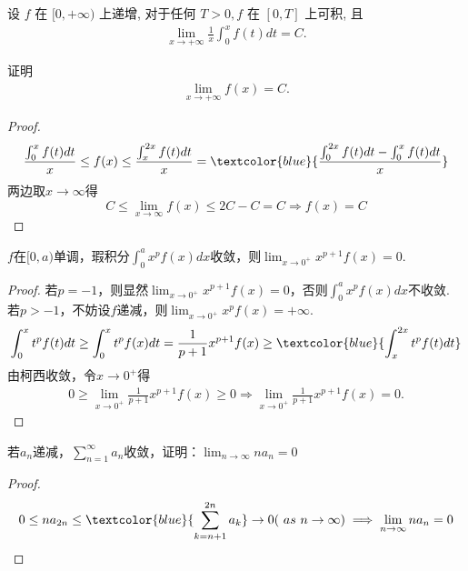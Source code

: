 \begin{exercise}
设 $f$ 在 $[0,+\infty)$ 上递增, 对于任何 $T>0, f$ 在 $[0, T]$ 上可积, 且
\begin{align*}
    \lim _{x \rightarrow+\infty} \frac{1}{x} \int_0^x f(t) d t=C .
\end{align*}

证明
\begin{align*}
    \lim _{x \rightarrow+\infty} f(x)=C .
\end{align*}
\end{exercise}

\begin{proof}
    $$\frac{\int_{0}^{x}f(t)dt}{x}\le f(x)\le \frac{\int_{x}^{2x}f(t)dt}{x}=\textcolor{blue}{\frac{\int_{0}^{2x}f(t)dt-\int_{0}^{x}f(t)dt}{x}}$$
    两边取$x\to \infty$得
    $$C\le \lim_{x\to \infty}f(x)\le 2C-C=C\Rightarrow f(x)=C$$
\end{proof}

\begin{exercise}
$f$在$[0,a)$单调，瑕积分$\int_{0}^{a}x^pf(x)dx$收敛，则$\lim_{x\to 0^+}x^{p+1}f(x)=0$.
\end{exercise}

\begin{proof}
    若$p=-1$，则显然$\lim_{x\to 0^+}x^{p+1}f(x)=0$，否则$\int_{0}^{a}x^pf(x)dx$不收敛. 若$p>-1$，不妨设$f$递减，则$\lim_{x\to 0^+}x^pf(x)=+\infty$.
    \begin{align*}
        \int_{0}^{x}t^pf(t)dt\ge \int_{0}^{x}t^pf(x)dt= \frac{1}{p+1}x^{p+1}f(x)\ge \textcolor{blue}{\int_{x}^{2x}t^pf(t)dt}
    \end{align*}
    由柯西收敛，令$x\to 0^+$得
    \begin{align*}
        0\ge\lim_{x\to 0^+}\frac{1}{p+1}x^{p+1}f(x)\ge 0\Rightarrow \lim_{x\to 0^+}\frac{1}{p+1}x^{p+1}f(x)=0.
    \end{align*}
\end{proof}

\begin{exercise}
若$a_n$递减，$\sum_{n=1}^{\infty}a_n$收敛，证明：$\lim_{n\to \infty}na_n=0$
\end{exercise}

\begin{proof}
    \begin{align*}
        0\le na_{2n} \le \textcolor{blue}{\sum_{k=n+1}^{2n}a_k}\to 0(\ as \ n\to \infty) \implies \lim_{n\to \infty}na_n=0
    \end{align*}
\end{proof}

